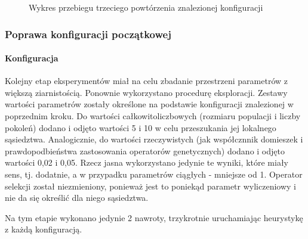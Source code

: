 \documentclass[./FM_mgr.tex]{subfiles}
\begin{document}
\begin{figure}[H]
	\caption{Wykres przebiegu trzeciego powtórzenia znalezionej konfiguracji \label{figure:tsp_init_example}}
	\centering
\end{figure}

\subsubsection{Poprawa konfiguracji początkowej}

\paragraph{Konfiguracja} Kolejny etap eksperymentów miał na celu zbadanie przestrzeni parametrów z większą ziarnistością.
Ponownie wykorzystano procedurę eksploracji.
Zestawy wartości parametrów zostały określone na podstawie konfiguracji znalezionej w poprzednim kroku.
Do wartości całkowitoliczbowych (rozmiaru populacji i liczby pokoleń) dodano i odjęto wartości 5 i 10 w celu przeszukania jej lokalnego sąsiedztwa.
Analogicznie, do wartości rzeczywistych (jak współcznnik domieszek i prawdopodbieństwa zastosowania operatorów genetycznych) dodano i odjęto wartości 0,02 i 0,05.
Rzecz jasna wykorzystano jedynie te wyniki, które miały sens, tj. dodatnie, a w przypadku parametrów ciągłych - mniejsze od 1.
Operator selekcji został niezmieniony, ponieważ jest to poniekąd parametr wyliczeniowy i nie da się określić dla niego sąsiedztwa.

Na tym etapie wykonano jedynie 2 nawroty, trzykrotnie uruchamiając heurystykę z każdą konfiguracją.
\end{document}
